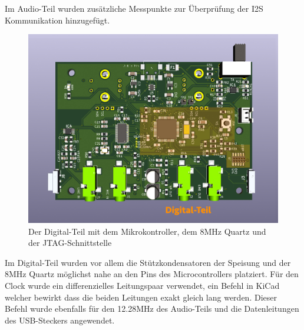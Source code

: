 Im Audio-Teil wurden zusätzliche Messpunkte zur Überprüfung der I2S Kommunikation hinzugefügt. 

\begin{figure} [H]
\begin{center}
 \includegraphics[scale=0.37]{../graphics/PCB-Layout_DGTL.jpg}
 \caption{Der Digital-Teil mit dem Mikrokontroller, dem 8MHz Quartz und der JTAG-Schnittstelle}
\label{fig:PCB_DGTL}
\end{center}
\end{figure}

Im Digital-Teil wurden vor allem die Stützkondensatoren der Speisung und der 8MHz Quartz möglichst nahe an den Pins des Microcontrollers platziert. Für den Clock wurde ein differenzielles Leitungspaar verwendet, ein Befehl in KiCad welcher bewirkt dass die beiden Leitungen exakt gleich lang werden. Dieser Befehl wurde ebenfalls für den 12.28MHz des Audio-Teils und die Datenleitungen des USB-Steckers angewendet.


